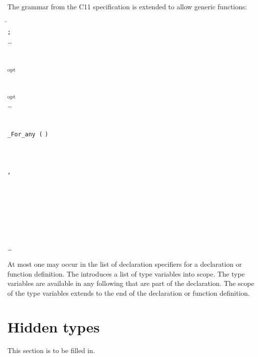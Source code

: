 The grammar from the C11 specification \cite{ISO2011} is extended to allow
generic functions:
\begin{tabbing}
\=\\
\>  \texttt{;} \\
\>\ldots{} \\
\\
\\
\>   
  \textsubscript{opt} \\
\\
\\
\> \textsubscript{opt} \\
\>\ldots{} \\
\\
\\
\>\texttt{\_For\_any (}  \texttt{)} \\
\\
 \\
\> \\
\> \texttt{,} \\
\\
 \\
\> \\
\\
\\
 \\
\> \\
\>\ldots{} \\
\end{tabbing}
At most one  may occur in the list of declaration specifiers
for a declaration or function definition.
The  introduces a list of type variables into scope.  
The type variables are available in any following  that are part
of the declaration.  The scope of the type variables extends to the end of
the declaration or function definition.

\section{Hidden types}
This section is to be filled in.

